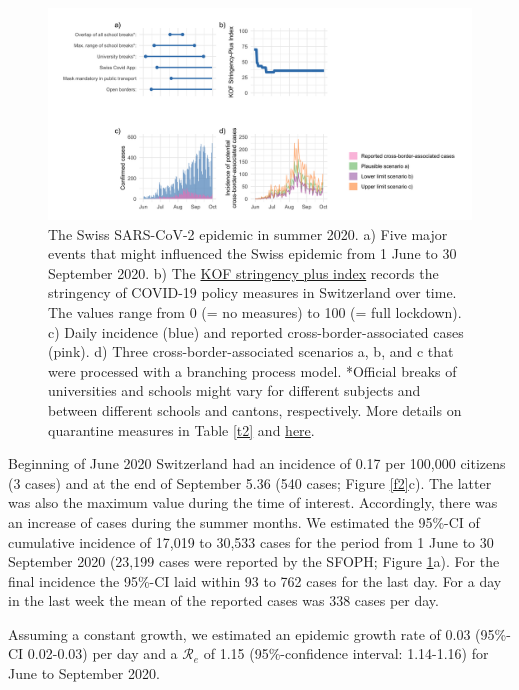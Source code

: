 \documentclass[10pt, a4paper, twoside]{article}
\begin{document}
\begin{multicols}{2}
\begin{figure}
\centering
\includegraphics[scale=0.15]{Figure1_2021-06-02.png}
\caption{The Swiss SARS-CoV-2 epidemic in summer 2020.
a) Five major events that might influenced the Swiss epidemic from 1 June to 30 September 2020.
b) The \href{https://kof.ethz.ch/en/forecasts-and-indicators/indicators/kof-stringency-index.html}{KOF stringency plus index} records the stringency of COVID-19 policy measures in Switzerland over time.
The values range from 0 (= no measures) to 100 (= full lockdown).
c) Daily incidence (blue) and reported cross-border-associated cases (pink).
d) Three cross-border-associated scenarios a, b, and c that were processed with a branching process model.
*Official breaks of universities and schools might vary for different subjects and between different schools and cantons, respectively.
More details on quarantine measures in Table \ref{t2} and \href{https://www.fedlex.admin.ch/eli/cc/2021/61/de}{here}.}
\label{f1}
\end{figure}

Beginning of June 2020 Switzerland had an incidence of 0.17 per 100,000 citizens (3 cases) and at the end of September 5.36 (540 cases; Figure \ref{f2}c).
The latter was also the maximum value during the time of interest.
Accordingly, there was an increase of cases during the summer months.
We estimated the 95\%-CI of cumulative incidence of 17,019 to 30,533 cases for the period from 1 June to 30 September 2020 (23,199 cases were reported by the SFOPH; Figure \ref{f1}a).
For the final incidence the 95\%-CI laid within 93 to 762 cases for the last day.
For a day in the last week the mean of the reported cases was 338 cases per day.

Assuming a constant growth, we estimated an epidemic growth rate of 0.03 (95\%-CI 0.02-0.03) per day and a $\mathcal{R}_e$ of 1.15 (95\%-confidence interval: 1.14-1.16) for June to September 2020.



\end{multicols}
\end{document}
